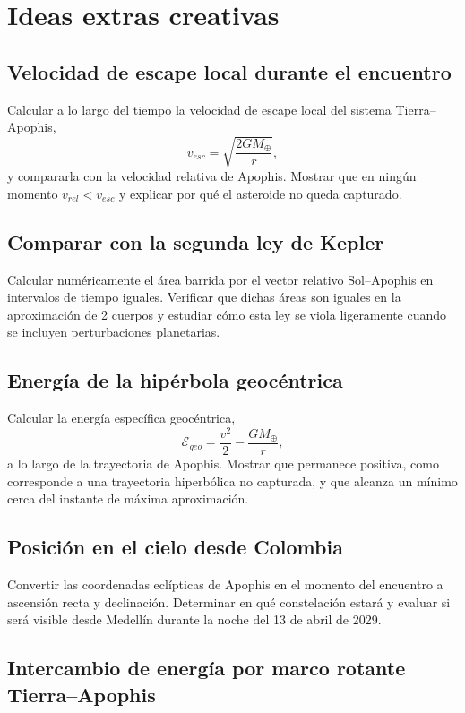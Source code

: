 \section{Ideas extras creativas}

\subsection{Velocidad de escape local durante el encuentro}

Calcular a lo largo del tiempo la velocidad de escape local del sistema Tierra--Apophis,
\[
v_{esc} = \sqrt{\frac{2 G M_{\oplus}}{r}},
\]
y compararla con la velocidad relativa de Apophis. Mostrar que en ningún momento $v_{rel} < v_{esc}$ y explicar por qué el asteroide no queda capturado.

\subsection{Comparar con la segunda ley de Kepler}

Calcular numéricamente el área barrida por el vector relativo Sol--Apophis en intervalos de tiempo iguales. Verificar que dichas áreas son iguales en la aproximación de 2 cuerpos y estudiar cómo esta ley se viola ligeramente cuando se incluyen perturbaciones planetarias.

\subsection{Energía de la hipérbola geocéntrica}

Calcular la energía específica geocéntrica,
\[
\mathcal{E}_{geo} = \frac{v^2}{2} - \frac{G M_{\oplus}}{r},
\]
a lo largo de la trayectoria de Apophis. Mostrar que permanece positiva, como corresponde a una trayectoria hiperbólica no capturada, y que alcanza un mínimo cerca del instante de máxima aproximación.

\subsection{Posición en el cielo desde Colombia}

Convertir las coordenadas eclípticas de Apophis en el momento del encuentro a ascensión recta y declinación. Determinar en qué constelación estará y evaluar si será visible desde Medellín durante la noche del 13 de abril de 2029.

\subsection{Intercambio de energía por marco rotante Tierra--Apophis}

